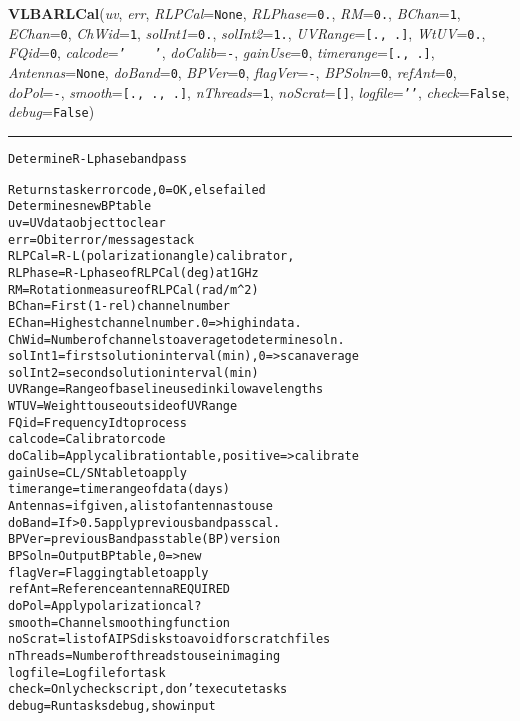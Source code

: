    \begin{boxedminipage}{\textwidth}

    \raggedright \textbf{VLBARLCal}(\textit{uv}, \textit{err}, \textit{RLPCal}=\texttt{N\-o\-n\-e\-}, \textit{RLPhase}=\texttt{0\-.\-}, \textit{RM}=\texttt{0\-.\-}, \textit{BChan}=\texttt{1\-}, \textit{EChan}=\texttt{0\-}, \textit{ChWid}=\texttt{1\-}, \textit{solInt1}=\texttt{0\-.\-}, \textit{solInt2}=\texttt{1\-.\-}, \textit{UVRange}=\texttt{[\-.\-,\-~\-.\-]\-}, \textit{WtUV}=\texttt{0\-.\-}, \textit{FQid}=\texttt{0\-}, \textit{calcode}=\texttt{'\-~\-~\-~\-~\-'\-}, \textit{doCalib}=\texttt{-\-}, \textit{gainUse}=\texttt{0\-}, \textit{timerange}=\texttt{[\-.\-,\-~\-.\-]\-}, \textit{Antennas}=\texttt{N\-o\-n\-e\-}, \textit{doBand}=\texttt{0\-}, \textit{BPVer}=\texttt{0\-}, \textit{flagVer}=\texttt{-\-}, \textit{BPSoln}=\texttt{0\-}, \textit{refAnt}=\texttt{0\-}, \textit{doPol}=\texttt{-\-}, \textit{smooth}=\texttt{[\-.\-,\-~\-.\-,\-~\-.\-]\-}, \textit{nThreads}=\texttt{1\-}, \textit{noScrat}=\texttt{[\-]\-}, \textit{logfile}=\texttt{'\-'\-}, \textit{check}=\texttt{F\-a\-l\-s\-e\-}, \textit{debug}=\texttt{F\-a\-l\-s\-e\-})

    \vspace{-1.5ex}

    \rule{\textwidth}{0.5\fboxrule}
\begin{alltt}
Determine R-L phase bandpass

Returns task error code, 0=OK, else failed
Determines new BP table
uv       = UV data object to clear
err      = Obit error/message stack
RLPCal   = R-L (polarization angle) calibrator,
RLPhase  = R-L phase of RLPCal (deg) at 1 GHz
RM       = Rotation measure of RLPCal (rad/m{\textasciicircum}2)
BChan    = First (1-rel) channel number
EChan    = Highest channel number. 0={\textgreater} high in data.
ChWid    = Number of channels to average to determine soln.
solInt1  = first solution interval (min), 0={\textgreater} scan average
solInt2  = second solution interval (min)
UVRange  = Range of baseline used in kilowavelengths
WTUV     = Weight to use outside of UVRange
FQid     = Frequency Id to process
calcode  = Calibrator code
doCalib  = Apply calibration table, positive={\textgreater}calibrate
gainUse  = CL/SN table to apply
timerange= time range of data (days)
Antennas = if given, a list of antennas to use
doBand   = If {\textgreater}0.5 apply previous bandpass cal.
BPVer    = previous Bandpass table (BP) version
BPSoln   = Output BP table, 0={\textgreater}new
flagVer  = Flagging table to apply
refAnt   = Reference antenna REQUIRED
doPol    = Apply polarization cal?
smooth   = Channel smoothing function
noScrat  = list of AIPS disks to avoid for scratch files
nThreads = Number of threads to use in imaging
logfile  = Log file for task
check    = Only check script, don't execute tasks
debug    = Run tasks debug, show input\end{alltt}

    \vspace{1ex}

    \end{boxedminipage}

